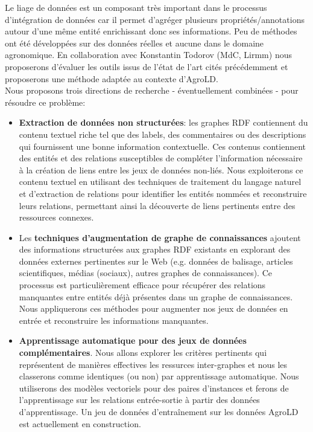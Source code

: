 Le liage de données est un composant très important dans le processus d’intégration de données car il permet d’agréger plusieurs propriétés/annotations autour d’une même entité enrichissant donc ses informations. Peu de méthodes ont été développées sur des données réelles et aucune dans le domaine agronomique. En collaboration avec Konstantin Todorov (MdC, Lirmm) nous proposerons d'évaluer les outils issus de l'état de l'art cités précédemment et proposerons une méthode adaptée au contexte d’AgroLD. \\


Nous proposons trois directions de recherche - éventuellement combinées - pour résoudre ce problème:
\begin{itemize}

\item \textbf{Extraction de données non structurées}: les graphes RDF contiennent du contenu textuel riche tel que des labels, des commentaires ou des descriptions qui fournissent une bonne information contextuelle. Ces contenus contiennent des entités et des relations susceptibles de compléter l'information nécessaire à la création de liens entre les jeux de données non-liés. Nous exploiterons ce contenu textuel en utilisant des techniques de traitement du langage naturel et d'extraction de relations pour identifier les entités nommées et reconstruire leurs relations, permettant ainsi la découverte de liens pertinents entre des ressources connexes.

 \item Les \textbf{techniques d'augmentation de graphe de connaissances} ajoutent des informations structurées aux graphes RDF existants en explorant des données externes pertinentes sur le Web (e.g. données de balisage, articles scientifiques, médias (sociaux), autres graphes de connaissances). Ce processus est particulièrement efficace pour récupérer des relations manquantes entre entités déjà présentes dans un graphe de connaissances. Nous appliquerons ces méthodes pour augmenter nos jeux de données en entrée et reconstruire les informations manquantes.
 
\item \textbf{Apprentissage automatique pour des jeux de données complémentaires}. Nous allons explorer les critères pertinents qui représentent de manières effectives les ressurces inter-graphes et nous les classerons comme identiques (ou non) par apprentissage automatique. Nous utiliserons des  modèles vectoriels pour des paires d'instances et ferons de l'apprentissage sur les relations entrée-sortie à partir des données d'apprentissage. Un jeu de données d'entraînement sur les données AgroLD est actuellement en construction.\\

\end{itemize}

